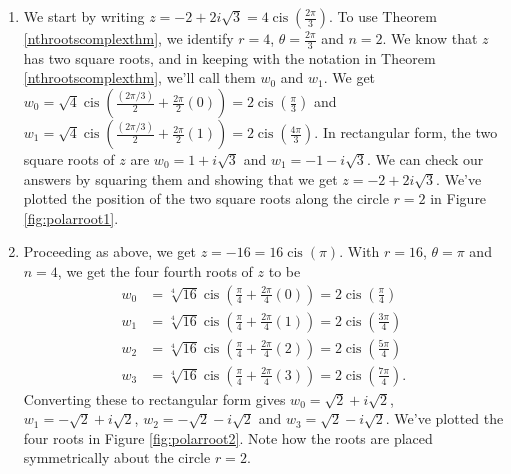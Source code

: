 {
\begin{enumerate}

\item  We start by writing $z= - 2 + 2i\sqrt{3} = 4 \operatorname{cis}\left(\frac{2\pi}{3}\right)$.  To use Theorem \ref{nthrootscomplexthm}, we identify $r =4$,  $\theta = \frac{2\pi}{3}$ and $n=2$.  We know that $z$ has two square roots, and in keeping with the notation in Theorem \ref{nthrootscomplexthm}, we'll call them  $w_{0}$ and $w_{1}$.  We get $w_{0} = \sqrt{4} \operatorname{cis}\left(\frac{(2\pi/3)}{2} + \frac{2\pi}{2} (0)\right) = 2\operatorname{cis}\left(\frac{\pi}{3}\right)$ and $w_{1} = \sqrt{4} \operatorname{cis}\left(\frac{(2\pi/3)}{2} + \frac{2\pi}{2} (1)\right) = 2\operatorname{cis}\left(\frac{4\pi}{3}\right)$.  In rectangular form, the two square roots of $z$ are $w_{0} = 1+i\sqrt{3}$ and $w_{1} = -1-i\sqrt{3}$.  We can check our answers by squaring them and showing that we get $z= -2 + 2i\sqrt{3}$. We've plotted the position of the two square roots along the circle $r=2$ in Figure \ref{fig:polarroot1}.


\item  Proceeding as above, we get $z = -16 = 16 \operatorname{cis}(\pi)$.  With $r = 16$, $\theta = \pi$ and $n = 4$, we get the four fourth roots of $z$ to be  
\begin{align*}
w_{0} &= \sqrt[4]{16} \operatorname{cis}\left(\frac{\pi}{4} + \frac{2\pi}{4} (0)\right) = 2\operatorname{cis}\left(\frac{\pi}{4}\right)\\
w_{1} &= \sqrt[4]{16} \operatorname{cis}\left(\frac{\pi}{4} + \frac{2\pi}{4} (1)\right) = 2\operatorname{cis}\left(\frac{3\pi}{4}\right)\\
w_{2} &= \sqrt[4]{16} \operatorname{cis}\left(\frac{\pi}{4} + \frac{2\pi}{4} (2)\right) = 2\operatorname{cis}\left(\frac{5\pi}{4}\right)\\
w_{3} &= \sqrt[4]{16} \operatorname{cis}\left(\frac{\pi}{4} + \frac{2\pi}{4} (3)\right) = 2\operatorname{cis}\left(\frac{7\pi}{4}\right).
\end{align*}
Converting these to rectangular form gives $w_{0} = \sqrt{2} + i\sqrt{2}$,  $w_{1} = -\sqrt{2} + i\sqrt{2}$,  $w_{2} = -\sqrt{2} - i\sqrt{2}$ and  $w_{3} = \sqrt{2} - i\sqrt{2}$. We've plotted the four roots in Figure \ref{fig:polarroot2}. Note how the roots are placed symmetrically about the circle $r=2$.



\end{enumerate}}
